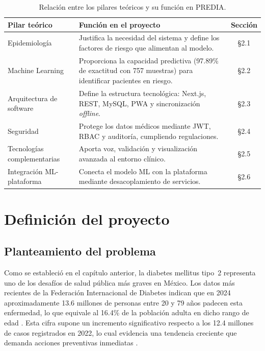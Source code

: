 \documentclass[12pt, letterpaper, twoside]{report}
\newcommand{\thead}[1]{\textbf{\sffamily #1}}
\newcommand{\trow}{}
\begin{document}
\begin{table}[H]
  \centering
  \caption{Relación entre los pilares teóricos y su función en PREDIA.}
  \label{tab:resumen_marco}
  \begin{tabularx}{\linewidth}{l X c}
    \toprule
    \thead{Pilar teórico} & \thead{Función en el proyecto} & \thead{Sección} \\
    \midrule
    \trow Epidemiología & Justifica la necesidad del sistema y define los factores de riesgo que alimentan al modelo. & §2.1 \\
    Machine Learning & Proporciona la capacidad predictiva (97.89\% de exactitud con 757 muestras) para identificar pacientes en riesgo. & §2.2 \\
    \trow Arquitectura de software & Define la estructura tecnológica: Next.js, REST, MySQL, PWA y sincronización \textit{offline}. & §2.3 \\
    Seguridad & Protege los datos médicos mediante JWT, RBAC y auditoría, cumpliendo regulaciones. & §2.4 \\
    \trow Tecnologías complementarias & Aporta voz, validación y visualización avanzada al entorno clínico. & §2.5 \\
    Integración ML-plataforma & Conecta el modelo ML con la plataforma mediante desacoplamiento de servicios. & §2.6 \\
    \bottomrule
  \end{tabularx}
\end{table}

\chapter{Definición del proyecto}

\section{Planteamiento del problema}

Como se estableció en el capítulo anterior, la diabetes mellitus tipo~2 representa uno de los desafíos de salud pública más graves en México. Los datos más recientes de la Federación Internacional de Diabetes indican que en 2024 aproximadamente 13.6 millones de personas entre 20 y 79 años padecen esta enfermedad, lo que equivale al 16.4\% de la población adulta en dicho rango de edad \citep{idf_atlas, ogle2025}. Esta cifra supone un incremento significativo respecto a los 12.4 millones de casos registrados en 2022, lo cual evidencia una tendencia creciente que demanda acciones preventivas inmediatas \citep{basto2021}.
\end{document}
